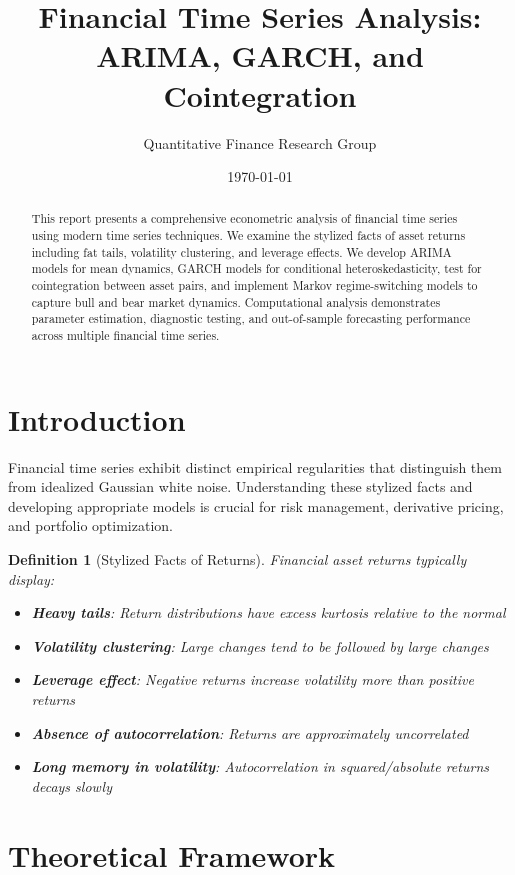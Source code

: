\documentclass[a4paper, 11pt]{article}
\title{Financial Time Series Analysis: ARIMA, GARCH, and Cointegration}
\author{Quantitative Finance Research Group}
\date{\today}
\newtheorem{definition}{Definition}[section]
\begin{document}
\maketitle

\begin{abstract}
This report presents a comprehensive econometric analysis of financial time series using modern
time series techniques. We examine the stylized facts of asset returns including fat tails,
volatility clustering, and leverage effects. We develop ARIMA models for mean dynamics, GARCH
models for conditional heteroskedasticity, test for cointegration between asset pairs, and
implement Markov regime-switching models to capture bull and bear market dynamics. Computational
analysis demonstrates parameter estimation, diagnostic testing, and out-of-sample forecasting
performance across multiple financial time series.
\end{abstract}

\section{Introduction}

Financial time series exhibit distinct empirical regularities that distinguish them from
idealized Gaussian white noise. Understanding these stylized facts and developing appropriate
models is crucial for risk management, derivative pricing, and portfolio optimization.

\begin{definition}[Stylized Facts of Returns]
Financial asset returns typically display:
\begin{itemize}
\item \textbf{Heavy tails}: Return distributions have excess kurtosis relative to the normal
\item \textbf{Volatility clustering}: Large changes tend to be followed by large changes
\item \textbf{Leverage effect}: Negative returns increase volatility more than positive returns
\item \textbf{Absence of autocorrelation}: Returns are approximately uncorrelated
\item \textbf{Long memory in volatility}: Autocorrelation in squared/absolute returns decays slowly
\end{itemize}
\end{definition}

\section{Theoretical Framework}
\end{document}
